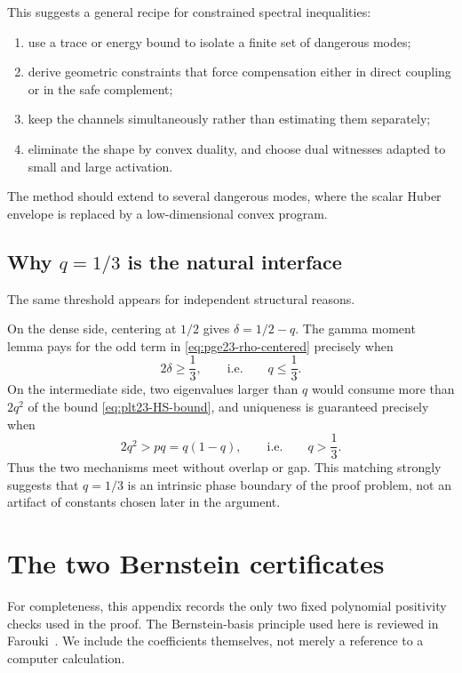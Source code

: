 \documentclass[11pt]{article}
\numberwithin{equation}{section}
\begin{document}
This suggests a general recipe for constrained spectral inequalities:
\begin{enumerate}[leftmargin=2.2em]
  \item use a trace or energy bound to isolate a finite set of dangerous
  modes;
  \item derive geometric constraints that force compensation either in direct
  coupling or in the safe complement;
  \item keep the channels simultaneously rather than estimating them
  separately;
  \item eliminate the shape by convex duality, and choose dual witnesses
  adapted to small and large activation.
\end{enumerate}
The method should extend to several dangerous modes, where the scalar Huber
envelope is replaced by a low-dimensional convex program.

\subsection{Why \texorpdfstring{$q=1/3$}{q=1/3} is the natural interface}

The same threshold appears for independent structural reasons.

On the dense side, centering at $1/2$ gives
$\delta=1/2-q$.  The gamma moment lemma pays for the odd term in
\eqref{eq:pge23-rho-centered} precisely when
\[
  2\delta\ge\frac{1}{3},
  \qquad\text{i.e.}\qquad q\le\frac{1}{3}.
\]
On the intermediate side, two eigenvalues larger than $q$ would consume
more than $2q^2$ of the bound \eqref{eq:plt23-HS-bound}, and uniqueness is guaranteed
precisely when
\[
  2q^2>pq=q(1-q),
  \qquad\text{i.e.}\qquad q>\frac{1}{3}.
\]
Thus the two mechanisms meet without overlap or gap.  This matching strongly
suggests that $q=1/3$ is an intrinsic phase boundary of the proof problem,
not an artifact of constants chosen later in the argument.
\appendix

\section{The two Bernstein certificates}\label{app:bernstein}

For completeness, this appendix records the only two fixed polynomial
positivity checks used in the proof.  The Bernstein-basis principle used
here is reviewed in Farouki~\cite{Farouki2012}.  We include the coefficients themselves,
not merely a reference to a computer calculation.
\end{document}
